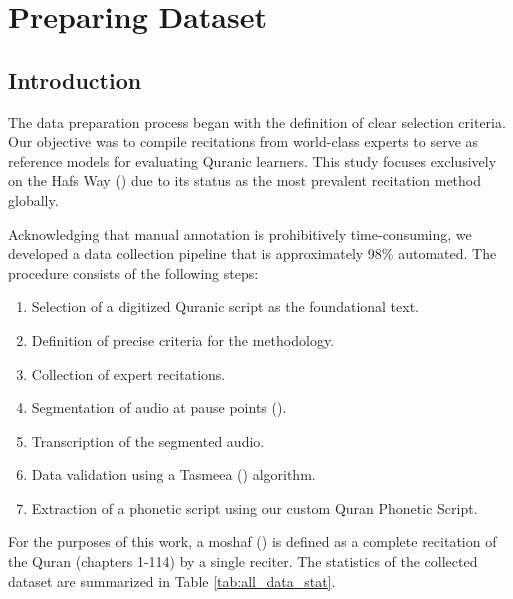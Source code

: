 
\chapter{Preparing Dataset} %

\label{Chapter4} %





\section{Introduction}

The data preparation process began with the definition of clear selection criteria. Our objective was to compile recitations from world-class experts to serve as reference models for evaluating Quranic learners. This study focuses exclusively on the Hafs Way () due to its status as the most prevalent recitation method globally.

Acknowledging that manual annotation is prohibitively time-consuming, we developed a data collection pipeline that is approximately 98\% automated. The procedure consists of the following steps:

\begin{enumerate}
\item Selection of a digitized Quranic script as the foundational text.
\item Definition of precise criteria for the  methodology.
\item Collection of expert recitations.
\item Segmentation of audio at pause points ().
\item Transcription of the segmented audio.
\item Data validation using a Tasmeea () algorithm.
\item Extraction of a phonetic script using our custom Quran Phonetic Script.
\end{enumerate}

For the purposes of this work, a moshaf () is defined as a complete recitation of the Quran (chapters 1-114) by a single reciter. The statistics of the collected dataset are summarized in Table \ref{tab:all_data_stat}.

